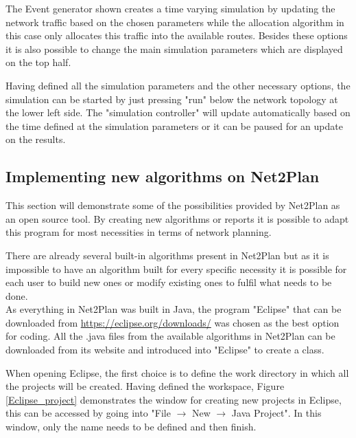 	The Event generator shown creates a time varying simulation by updating the network traffic based on the chosen parameters while the allocation algorithm in this case only allocates this traffic into the available routes. Besides these options it is also possible to change the main simulation parameters which are displayed on the top half.

	Having defined all the simulation parameters and the other necessary options, the simulation can be started by just pressing "run" below the network topology at the lower left side. The "simulation controller" will update automatically based on the time defined at the simulation parameters or it can be paused for an update on the results.
	
	\newpage

	\subsection{Implementing new algorithms on Net2Plan}
	\vspace{1cm}
	This section will demonstrate some of the possibilities provided by Net2Plan as an open source tool. By creating new algorithms or reports it is possible to adapt this program for most necessities in terms of network planning.

	There are already several built-in algorithms present in Net2Plan but as it is impossible to have an algorithm built for every specific necessity it is possible for each user to build new ones or modify existing ones to fulfil what needs to be done.\\
	
	As everything in Net2Plan was built in Java, the program "Eclipse" that can be downloaded from \url{https://eclipse.org/downloads/} was chosen as the best option for coding. All the .java files from the available algorithms in Net2Plan can be downloaded from its website and introduced into "Eclipse" to create a class.
	
	When opening Eclipse, the first choice is to define the work directory in which all the projects will be created. Having defined the workspace, Figure \ref{Eclipse_project} demonstrates the window for creating new projects in Eclipse, this can be accessed by going into "File $\rightarrow$ New $\rightarrow$ Java Project". In this window, only the name needs to be defined and then finish.
	
